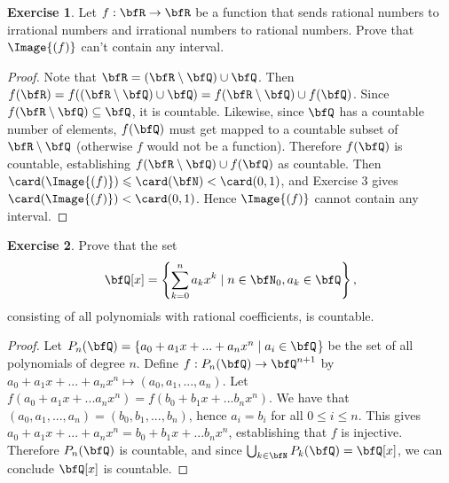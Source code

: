 \documentclass[10pt,twoside,openany]{memoir}
\theoremstyle{plain}
\theoremstyle{definition}
\newtheorem{exercise}{Exercise}
\theoremstyle{remark}
\numberwithin{equation}{section}
\renewcommand{\leq}{\leqslant}
\begin{document}
    \begin{exercise}
        Let $f: \bfR \rightarrow \bfR$ be a function that sends rational numbers to irrational  numbers and irrational numbers to rational numbers. Prove that $\Image{(f)}$ can't contain any interval.
    \end{exercise}
        \begin{proof}
            Note that $\bfR = (\bfR \setminus \bfQ)\cup \bfQ$. Then $f(\bfR) = f((\bfR \setminus \bfQ)\cup \bfQ) = f(\bfR \setminus \bfQ) \cup f(\bfQ)$. Since $f(\bfR \setminus \bfQ) \subseteq \bfQ$, it is countable. Likewise, since $\bfQ$ has a countable number of elements, $f(\bfQ)$ must get mapped to a countable subset of $\bfR\setminus \bfQ$ (otherwise $f$ would not be a function). Therefore $f(\bfQ)$ is countable, establishing $f(\bfR \setminus \bfQ) \cup f(\bfQ)$ as countable. Then $\card(\Image{(f)}) \leq \card({\bfN}) < \card(0,1)$, and Exercise 3 gives $\card(\Image{(f)}) < \card(0,1)$. Hence $\Image{(f)}$ cannot contain any interval.
        \end{proof}
    \begin{exercise}
        Prove that the set
            \begin{equation*}
            \begin{split}
                \bfQ[x] = \left\{\sum_{k=0}^n a_k x^k \mid n\in \bfN_0 , a_k \in \bfQ \right\},
            \end{split}
            \end{equation*}
        consisting of all polynomials with rational coefficients, is countable.
    \end{exercise}
        \begin{proof}
            Let $P_n(\bfQ) = \{a_0 + a_1 x + ... + a_n x^n \mid a_i \in \bfQ$\} be the set of all polynomials of degree $n$. Define $f:P_n(\bfQ) \rightarrow \bfQ^{n+1}$ by $a_0 + a_1x + ...+ a_nx^n \mapsto (a_0, a_1, ..., a_n)$. Let $f(a_0 + a_1x + ... a_nx^n) = f(b_0 + b_1x + ... b_nx^n)$. We have that $(a_0,a_1,...,a_n) = (b_0,b_1,...,b_n)$, hence $a_i = b_i$ for all $0 \leq i \leq n$. This gives $a_0 + a_1x + ... + a_n x^n = b_0 + b_1x + ... b_nx^n$, establishing that $f$ is injective. Therefore $P_n(\bfQ)$ is countable, and since $\bigcup_{k \in \bfN} P_k(\bfQ) = \bfQ[x]$, we can conclude $\bfQ[x]$ is countable.
        \end{proof}
\end{document}
